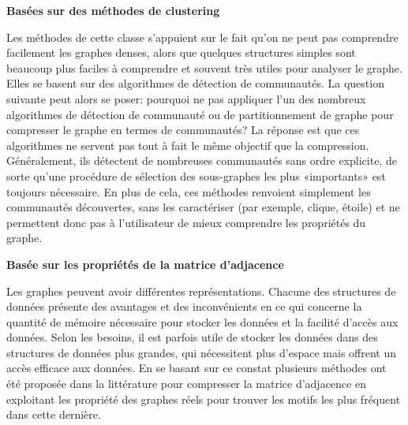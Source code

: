 \documentclass[a4paper,oneside,12pt]{report}
\theoremstyle{definition}
\begin{document}
					 \textbf{Basées sur des méthodes de clustering}
							
							Les méthodes de cette classe s'appuient sur le fait qu'on ne peut pas comprendre facilement les graphes denses, alors que quelques structures simples sont beaucoup plus faciles à comprendre et souvent très utiles pour analyser le graphe. Elles se basent sur des algorithmes de détection de communautés. 
							La question suivante peut alors se poser: pourquoi ne pas appliquer l'un des nombreux algorithmes de détection de communauté ou de partitionnement de graphe pour compresser le graphe en termes de communautés? La réponse est que ces algorithmes ne servent pas tout à fait le même objectif que la compression. Généralement, ils détectent de nombreuses communautés sans ordre explicite, de sorte qu'une procédure de sélection des sous-graphes les plus «importants» est toujours nécessaire. En plus de cela, ces méthodes renvoient simplement les communautés découvertes, sans les caractériser (par exemple, clique, étoile) et ne permettent donc pas à l'utilisateur de mieux comprendre les propriétés du graphe. 
							
							
							
							
							
							
							
			
					 \textbf{Basée sur les propriétés de la matrice d'adjacence}
							
							Les graphes peuvent avoir différentes représentations. Chacune des structures de données présente des avantages et des inconvénients en ce qui concerne la quantité de mémoire nécessaire pour stocker les données et la facilité d'accès aux données. Selon les besoins, il est parfois utile de stocker les données dans des structures de données plus grandes, qui nécessitent plus d'espace mais offrent un accès efficace aux données. En se basant sur ce constat plusieurs méthodes ont été  proposée dans la littérature pour compresser la matrice d'adjacence en exploitant les propriété des graphes réels pour trouver les motifs les plus fréquent dans cette dernière.
							
							
							
							
					
\end{document}
